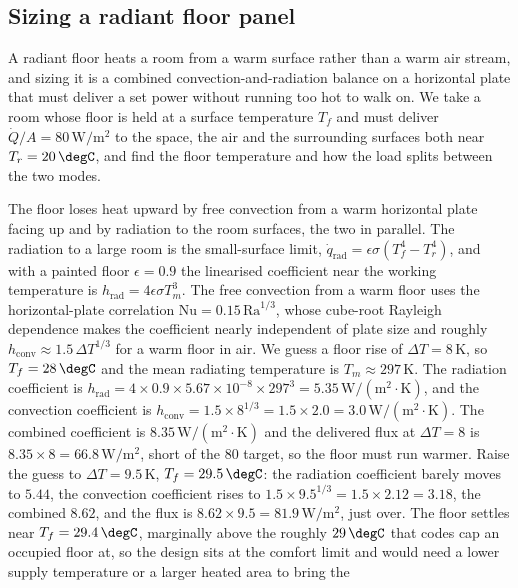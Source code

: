 \subsection{Sizing a radiant floor panel}

A radiant floor heats a room from a warm surface rather than a warm air
stream, and sizing it is a combined convection-and-radiation balance on a
horizontal plate that must deliver a set power without running too hot to walk
on. We take a room whose floor is held at a surface temperature $T_f$ and must
deliver $\dot{Q}/A = 80\,\text{W}/\text{m}^2$ to the space, the air and the
surrounding surfaces both near $T_r = 20\,\degC$, and find the floor
temperature and how the load splits between the two modes.

The floor loses heat upward by free convection from a warm horizontal plate
facing up and by radiation to the room surfaces, the two in parallel. The
radiation to a large room is the small-surface limit,
$\dot{q}_{\text{rad}} = \epsilon\sigma(T_f^4 - T_r^4)$, and with a painted
floor $\epsilon = 0.9$ the linearised coefficient near the working
temperature is $h_{\text{rad}} = 4\epsilon\sigma T_m^3$. The free convection
from a warm floor uses the horizontal-plate correlation $\text{Nu} =
0.15\,\text{Ra}^{1/3}$, whose cube-root Rayleigh dependence makes the
coefficient nearly independent of plate size and roughly
$h_{\text{conv}} \approx 1.5\,\Delta T^{1/3}$ for a warm floor in air. We
guess a floor rise of $\Delta T = 8\,\si{\kelvin}$, so $T_f = 28\,\degC$ and
the mean radiating temperature is $T_m \approx 297\,\si{\kelvin}$. The
radiation coefficient is $h_{\text{rad}} = 4\times0.9\times5.67\times10^{-8}
\times297^3 = 5.35\,\text{W}/(\text{m}^2\cdot\si{\kelvin})$, and the
convection coefficient is $h_{\text{conv}} = 1.5\times8^{1/3} = 1.5\times2.0 =
3.0\,\text{W}/(\text{m}^2\cdot\si{\kelvin})$. The combined coefficient is
$8.35\,\text{W}/(\text{m}^2\cdot\si{\kelvin})$ and the delivered flux at
$\Delta T = 8$ is $8.35\times8 = 66.8\,\text{W}/\text{m}^2$, short of the
$80$ target, so the floor must run warmer. Raise the guess to $\Delta T =
9.5\,\si{\kelvin}$, $T_f = 29.5\,\degC$: the radiation coefficient barely
moves to $5.44$, the convection coefficient rises to $1.5\times9.5^{1/3} =
1.5\times2.12 = 3.18$, the combined $8.62$, and the flux is $8.62\times9.5 =
81.9\,\text{W}/\text{m}^2$, just over. The floor settles near $T_f =
29.4\,\degC$, marginally above the roughly $29\,\degC$ that
codes cap an occupied floor at, so the design sits at the comfort limit and
would need a lower supply temperature or a larger heated area to bring the

